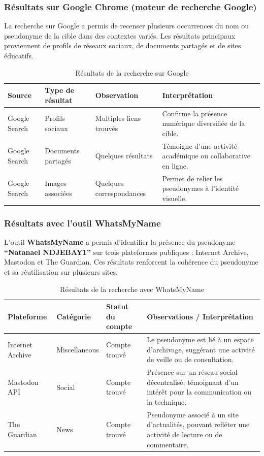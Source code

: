 \documentclass[memoire,12pt]{report}
\begin{document}
\subsubsection{Résultats sur Google Chrome (moteur de recherche Google)}

La recherche sur Google a permis de recenser plusieurs occurrences du nom ou pseudonyme de la cible dans des contextes variés.  
Les résultats principaux proviennent de profils de réseaux sociaux, de documents partagés et de sites éducatifs.

\begin{table}[H]
\centering
\caption{Résultats de la recherche sur Google}
\begin{tabular}{|p{3cm}|p{3cm}|p{3cm}|p{4cm}|}
\hline
\textbf{Source} & \textbf{Type de résultat} & \textbf{Observation} & \textbf{Interprétation} \\
\hline
Google Search & Profils sociaux & Multiples liens trouvés & Confirme la présence numérique diversifiée de la cible. \\
\hline
Google Search & Documents partagés & Quelques résultats & Témoigne d’une activité académique ou collaborative en ligne. \\
\hline
Google Search & Images associées & Quelques correspondances & Permet de relier les pseudonymes à l’identité visuelle. \\
\hline
\end{tabular}
\end{table}

\subsubsection{Résultats avec l’outil WhatsMyName}

L’outil \textbf{WhatsMyName} a permis d’identifier la présence du pseudonyme \textbf{``Natanael NDJEBAY1''} sur trois plateformes publiques : Internet Archive, Mastodon et The Guardian.  
Ces résultats renforcent la cohérence du pseudonyme et sa réutilisation sur plusieurs sites.

\begin{table}[H]
\centering
\caption{Résultats de la recherche avec WhatsMyName}
\begin{tabular}{|p{3cm}|p{3cm}|p{3cm}|p{4cm}|}
\hline
\textbf{Plateforme} & \textbf{Catégorie} & \textbf{Statut du compte} & \textbf{Observations / Interprétation} \\
\hline
Internet Archive & Miscellaneous & Compte trouvé & Le pseudonyme est lié à un espace d’archivage, suggérant une activité de veille ou de consultation. \\
\hline
Mastodon API & Social & Compte trouvé & Présence sur un réseau social décentralisé, témoignant d’un intérêt pour la communication ou la technique. \\
\hline
The Guardian & News & Compte trouvé & Pseudonyme associé à un site d’actualités, pouvant refléter une activité de lecture ou de commentaire. \\
\hline
\end{tabular}
\end{table}
\end{document}
